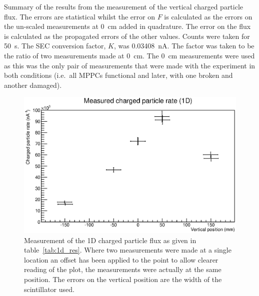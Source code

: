 \begin{table}
  \caption{Summary of the results from the measurement of the vertical charged particle flux. The errors are statistical whilst the error on \(F\) is calculated as the errors on the un-scaled measurements at 0~cm added in quadrature. The error on the flux is calculated as the propagated errors of the other values. Counts were taken for 50~s. The SEC conversion factor, \(K\), was 0.03408~nA. The factor was taken to be the ratio of two measurements made at 0~cm. The 0~cm measurements were used as this was the only pair of measurements that were made with the experiment in both conditions (i.e.\ all MPPCs functional and later, with one broken and another damaged).}
  \label{tab:1d_res}
\end{table}


\begin{figure}[hptb]
  \centering
  \includegraphics[width=.8\textwidth]{images/plot_generating_scripts/measured_1d_charged_flux.eps}
  \caption{Measurement of the 1D charged particle flux as given in table~\ref{tab:1d_res}. Where two measurements were made at a single location an offset has been applied to the point to allow clearer reading of the plot, the measurements were actually at the same position. The errors on the vertical position are the width of the scintillator used.}
  \label{fig:images_hit_rate_rescaled}
\end{figure}


